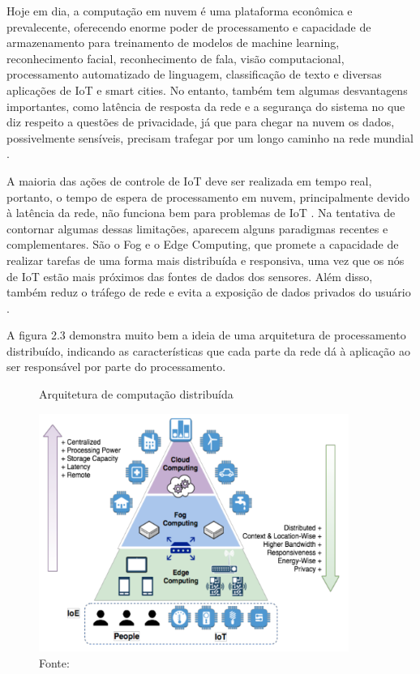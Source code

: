 Hoje em dia, a computação em nuvem é uma plataforma econômica e prevalecente, oferecendo enorme poder de processamento e capacidade de armazenamento para treinamento de modelos de machine learning, reconhecimento facial, reconhecimento de fala, visão computacional, processamento automatizado de linguagem, classificação de texto e diversas aplicações de IoT e smart cities. No entanto, também tem algumas desvantagens importantes, como latência de resposta da rede e a segurança do sistema no que diz respeito a questões de privacidade, já que para chegar na nuvem os dados, possivelmente sensíveis, precisam trafegar por um longo caminho na rede mundial \cite{Pacheco2018}.

A maioria das ações de controle de IoT deve ser realizada em tempo real, portanto, o tempo de espera de processamento em nuvem, principalmente devido à latência da rede, não funciona bem para problemas de IoT \cite{Singh2017}. Na tentativa de contornar algumas dessas limitações, aparecem alguns paradigmas recentes e complementares. São o Fog e o Edge Computing, que promete a capacidade de realizar tarefas de uma forma mais distribuída e responsiva, uma vez que os nós de IoT estão mais próximos das fontes de dados dos sensores. Além disso, também reduz o tráfego de rede e evita a exposição de dados privados do usuário \cite{Pacheco2018}.

A figura 2.3 demonstra muito bem a ideia de uma arquitetura de processamento distribuído, indicando as características que cada parte da rede dá à aplicação ao ser responsável por parte do processamento.
\begin{figure}[H]
    \centering
    \caption[Arquitetura de computação distribuída]{Arquitetura de computação distribuída}
    \includegraphics[width=0.9\textwidth]{Cap2_Revisao_Teorica/Figures/arquitetura_distribuida.png}
    \caption*{Fonte: \cite{Pacheco2018}}
    \label{fig:arquitetura}
\end{figure}

